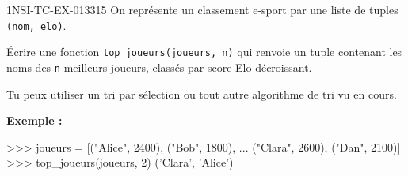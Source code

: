 \begin{exercice}{1NSI-TC-EX-013}{3}{15}
On représente un classement e-sport par une liste de tuples \lstinline{(nom, elo)}.

Écrire une fonction \lstinline{top_joueurs(joueurs, n)} qui renvoie un tuple contenant
les noms des \lstinline{n} meilleurs joueurs, classés par score Elo décroissant.

Tu peux utiliser un tri par sélection ou tout autre algorithme de tri vu en cours.

\textbf{Exemple :}
\begin{console}
>>> joueurs = [("Alice", 2400), ("Bob", 1800),
...            ("Clara", 2600), ("Dan", 2100)]
>>> top_joueurs(joueurs, 2)
('Clara', 'Alice')
\end{console}
\end{exercice}
